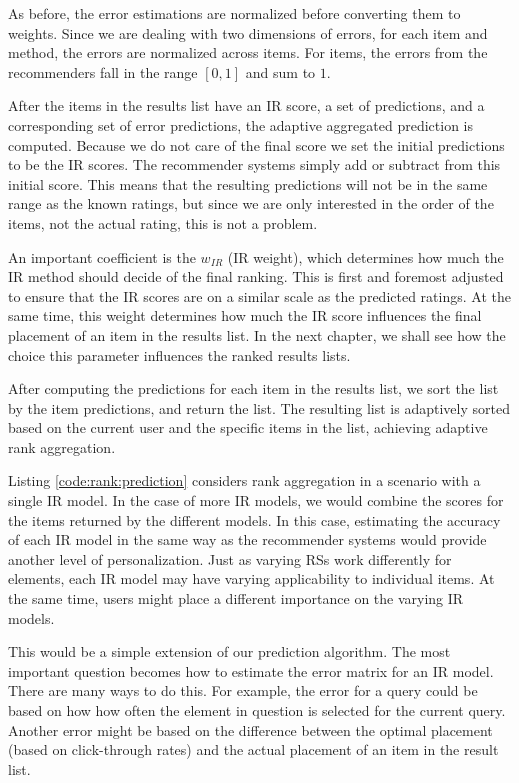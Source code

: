As before, the error estimations are normalized before converting them to weights.
Since we are dealing with two dimensions of errors, for each item and method,
the errors are normalized across items.
For items, the errors from the recommenders fall in the range $[0,1]$ and sum to $1$.

After the items in the results list have an IR score, a set of predictions, and a corresponding set of 
error predictions, the adaptive aggregated prediction is computed. 
Because we do not care of the final score we set the initial predictions to be the IR scores.
The recommender systems simply add or subtract from this initial score.
This means that the resulting predictions will not be in the same range as the known ratings,
but since we are only interested in the order of the items, not the actual rating, this is not a problem.

An important coefficient is the $w_{IR}$ (IR weight),
which determines how much the IR method should decide of the final ranking.
This is first and foremost adjusted to ensure that the IR scores
are on a similar scale as the predicted ratings.
At the same time, this weight determines how 
much the IR score influences the final placement of an item in the results list.
In the next chapter, we shall see how the choice this parameter 
influences the ranked results lists.

After computing the predictions for each item in the results list, 
we sort the list by the item predictions, and return the list.
The resulting list is adaptively sorted based on the current user and the specific items in the list,
achieving adaptive rank aggregation.

Listing \ref{code:rank:prediction} considers rank aggregation in a scenario with a single IR model.
In the case of more IR models,
we would combine the scores for the items returned by the different models.
In this case, estimating the accuracy of each IR model in the same way as the recommender systems
would provide another level of personalization.
Just as varying RSs work differently for elements, each IR model
may have varying applicability to individual items.
At the same time, users might place a different importance on the varying IR models.

This would be a simple extension of our prediction algorithm.
The most important question becomes how to estimate the error matrix for an IR model.
There are many ways to do this.
For example, the error for a query could be based on how 
how often the element in question is selected for the current query.
Another error might be based on the difference between
the optimal placement (based on click-through rates)
and the actual placement of an item in the result list.

